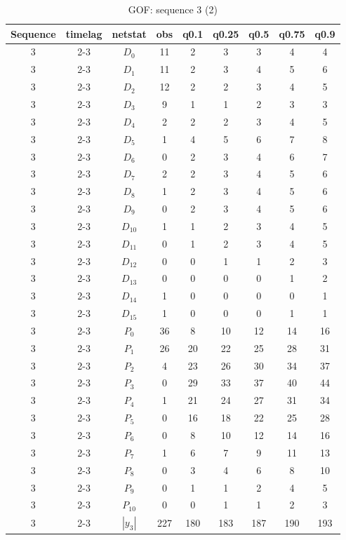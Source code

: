 \documentclass[a4paper, 11pt]{report}
\theoremstyle{definition}
\begin{document}
\clearpage
\begin{table}[h!]
    \centering
        \begin{tabular}{c| c | c | c | c |c |c |c |c }
            Sequence& timelag & netstat & obs & q0.1 & q0.25 & q0.5 & q0.75 & q0.9 \\
            \hline \hline
            3 & 2-3 & $D_0$ & 11 &  2& 3& 3& 4& 4 \\
            3 & 2-3 & $D_1$ & 11 &  2& 3& 4& 5& 6 \\
            3 & 2-3 & $D_2$ & 12 &  2& 2& 3& 4& 5 \\
            3 & 2-3 & $D_3$ & 9 &  1& 1& 2& 3& 3 \\
            3 & 2-3 & $D_4$ & 2 &  2& 2& 3& 4& 5 \\
            3 & 2-3 & $D_5$ & 1 &  4& 5& 6& 7& 8 \\
            3 & 2-3 & $D_6$ & 0 &  2& 3& 4& 6& 7 \\
            3 & 2-3 & $D_7$ & 2 &  2& 3& 4& 5& 6 \\
            3 & 2-3 & $D_8$ & 1 &  2& 3& 4& 5& 6 \\
            3 & 2-3 & $D_9$ & 0 &  2& 3& 4& 5& 6 \\
            3 & 2-3 & $D_{10}$ & 1 &  1& 2& 3& 4& 5 \\
            3 & 2-3 & $D_{11}$ & 0 &  1& 2& 3& 4& 5 \\
            3 & 2-3 & $D_{12}$ & 0 &  0& 1& 1& 2& 3 \\
            3 & 2-3 & $D_{13}$ & 0 &  0& 0& 0& 1& 2 \\
            3 & 2-3 & $D_{14}$ & 1 &  0& 0& 0& 0& 1 \\
            3 & 2-3 & $D_{15}$ & 1 &  0& 0& 0& 1& 1 \\
            3 & 2-3 & $P_0$ & 36 & 8& 10& 12& 14& 16 \\
            3 & 2-3 & $P_1$ & 26 & 20& 22& 25& 28& 31 \\
            3 & 2-3 & $P_2$ & 4 & 23& 26& 30& 34& 37 \\
            3 & 2-3 & $P_3$ & 0 & 29& 33& 37& 40& 44 \\
            3 & 2-3 & $P_4$ & 1 & 21& 24& 27& 31& 34 \\
            3 & 2-3 & $P_5$ & 0 & 16& 18& 22& 25& 28 \\
            3 & 2-3 & $P_6$ & 0 &  8& 10& 12& 14& 16 \\
            3 & 2-3 & $P_7$ & 1 &  6& 7& 9& 11& 13 \\
            3 & 2-3 & $P_8$ & 0 &  3& 4& 6& 8& 10 \\
            3 & 2-3 & $P_9$ & 0 &  1& 1& 2& 4& 5 \\
            3 & 2-3 & $P_10$ & 0 &  0& 1& 1& 2& 3 \\
            3 & 2-3 & $|y_3|$ & 227 &  180& 183& 187& 190& 193 \\
        \end{tabular}
        \caption{GOF: sequence 3 (2)}
    \end{table}
\clearpage
\end{document}
